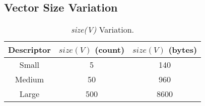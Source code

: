 \documentclass{sig-alternate}
\begin{document}
\subsection{Vector Size Variation}
\label{sec:variation}


\begin{table}[t]
  
  \begin{center}
  \begin{tabular}{| c | c | c |}
  \hline
  Descriptor & $size(V)$ (count) & $size(V)$ (bytes) \\
  \hline
  Small & 5 & 140 \\
  Medium & 50 & 960 \\
  Large & 500 & 8600 \\
  \hline
  \end{tabular}
\end{center}

  \vspace*{-.15in}
  \caption{{\em size(V)} Variation.}
  \label{tab:sizes}

\vspace*{-.2in}
\end{table}





\end{document}

